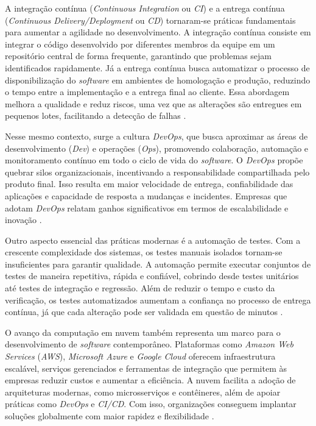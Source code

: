 \documentclass[english,brazilian]{UNISINOSartigo} %
\begin{document}
A integração contínua (\textit{Continuous Integration} ou \textit{CI}) e a entrega contínua (\textit{Continuous Delivery/Deployment} ou \textit{CD}) tornaram-se práticas fundamentais para aumentar a agilidade no desenvolvimento. A integração contínua consiste em integrar o código desenvolvido por diferentes membros da equipe em um repositório central de forma frequente, garantindo que problemas sejam identificados rapidamente. Já a entrega contínua busca automatizar o processo de disponibilização do \textit{software} em ambientes de homologação e produção, reduzindo o tempo entre a implementação e a entrega final ao cliente. Essa abordagem melhora a qualidade e reduz riscos, uma vez que as alterações são entregues em pequenos lotes, facilitando a detecção de falhas \cite{fowler2006}.

Nesse mesmo contexto, surge a cultura \textit{DevOps}, que busca aproximar as áreas de desenvolvimento (\textit{Dev}) e operações (\textit{Ops}), promovendo colaboração, automação e monitoramento contínuo em todo o ciclo de vida do \textit{software}. O \textit{DevOps} propõe quebrar silos organizacionais, incentivando a responsabilidade compartilhada pelo produto final. Isso resulta em maior velocidade de entrega, confiabilidade das aplicações e capacidade de resposta a mudanças e incidentes. Empresas que adotam \textit{DevOps} relatam ganhos significativos em termos de escalabilidade e inovação \cite{kim2016}.

Outro aspecto essencial das práticas modernas é a automação de testes. Com a crescente complexidade dos sistemas, os testes manuais isolados tornam-se insuficientes para garantir qualidade. A automação permite executar conjuntos de testes de maneira repetitiva, rápida e confiável, cobrindo desde testes unitários até testes de integração e regressão. Além de reduzir o tempo e custo da verificação, os testes automatizados aumentam a confiança no processo de entrega contínua, já que cada alteração pode ser validada em questão de minutos \cite{fewster1999}.

O avanço da computação em nuvem também representa um marco para o desenvolvimento de \textit{software} contemporâneo. Plataformas como \textit{Amazon Web Services} (\textit{AWS}), \textit{Microsoft Azure} e \textit{Google Cloud} oferecem infraestrutura escalável, serviços gerenciados e ferramentas de integração que permitem às empresas reduzir custos e aumentar a eficiência. A nuvem facilita a adoção de arquiteturas modernas, como microsserviços e contêineres, além de apoiar práticas como \textit{DevOps} e \textit{CI/CD}. Com isso, organizações conseguem implantar soluções globalmente com maior rapidez e flexibilidade \cite{armstrong2019}.
\end{document}
